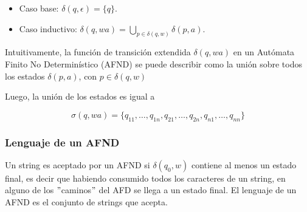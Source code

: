 \documentclass[11pt]{article}
\begin{document}
    \begin{itemize}
        \item Caso base: $\delta(q, \epsilon) = \{q\}$.
        \item Caso inductivo: $\delta(q, wa) = \bigcup_{p \in \delta(q, w)} \delta(p, a)$.
    \end{itemize}

    Intuitivamente, la función de transición extendida $\delta(q, wa)$ en un Autómata Finito No Determinístico (AFND) se puede describir como la unión sobre todos los estados $\delta(p, a)$, con $p \in \delta(q, w)$


    Luego, la unión de los estados es igual a

    \[
        \sigma(q, wa) = \{q_{11}, \ldots, q_{1n}, q_{21},\ldots, q_{2n}, q_{n1},\ldots, q_{nn}\}
    \]

    \subsubsection{Lenguaje de un AFND}

    Un string es aceptado por un AFND si $\delta(q_0, w)$ contiene al menos un estado final, es decir que habiendo consumido todos los caracteres de un string, en alguno de los \("\)caminos\("\) del AFD se llega a un estado final. El lenguaje de un AFND es el conjunto de strings que acepta.
\end{document}
